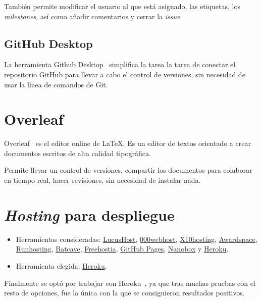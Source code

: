 También permite modificar el usuario al que está asignado, las etiquetas, los \textit{milestones}, así como añadir comentarios y cerrar la \textit{issue}.

\subsection{GitHub Desktop}

La herramienta Github Desktop~\cite{pagina_github_desktop} simplifica la tarea la tarea de conectar el repositorio GitHub para llevar a cabo el control de versiones, sin necesidad de usar la línea de comandos de Git.

\section{Overleaf}
Overleaf~\cite{pagina_overleaf} es el editor online de \LaTeX. Es un editor de textos orientado a crear documentos escritos de alta calidad tipográfica.

Permite llevar un control de versiones, compartir los documentos para colaborar en tiempo real, hacer revisiones, sin necesidad de instalar nada.

\section{\textit{Hosting} para despliegue}
\begin{itemize}
\tightlist
    \item Herramientas consideradas: \href{https://www.lucushost.com/hosting-gratis?utm_medium=affiliate&utm_source=114&utm_campaign=Afiliados}{LucusHost}, \href{https://www.000webhost.com/}{000webhost}, \href{https://x10hosting.com/free-web-hosting}{X10hosting}, \href{https://www.awardspace.com/}{Awardspace}, \href{https://go.runhosting.com/free-web-hosting.html}{Runhosting}, \href{https://www.batcave.net/free-web-hosting.html}{Batcave}, \href{https://www.freehostia.com/free-cloud-hosting/}{Freehostia}, \href{https://pages.github.com/}{GitHub Pages}, \href{https://nanobox.io/}{Nanobox} y \href{https://www.heroku.com/home}{Heroku}.
    \item Herramienta elegida: \href{https://www.heroku.com/home}{Heroku}.
\end{itemize}

Finalmente se optó por trabajar con Heroku~\cite{pagina_heroku}, ya que tras muchas pruebas con el resto de opciones, fue la única con la que se consiguieron resultados positivos.

